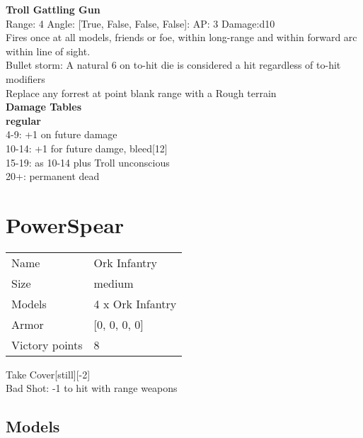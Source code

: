 {\bf Troll Gattling Gun } \\



Range: 4  Angle: [True, False, False, False]: AP: 3 Damage:d10 \\
Fires once at all models, friends or foe, within long-range and within forward arc within line of sight.\\ 
Bullet storm: A natural 6 on to-hit die is considered a hit regardless of to-hit modifiers\\ 
Replace any forrest at point blank range with a Rough terrain\\ 




 





{\bf Damage Tables} \\
 {\bf regular } \\
4-9: +1 on future damage \\
10-14: +1 for future damge, bleed[12] \\
15-19: as 10-14 plus Troll unconscious \\
20+: permanent dead \\










\pagebreak\pagebreak

\section{ PowerSpear }

\begin{tabular}{ll}
  Name & Ork Infantry \\
  Size & medium\\
  Models & 4 x Ork Infantry\\
  Armor & [0, 0, 0, 0]\\
  Victory points & 8\\
\end{tabular}

Take Cover[still][-2]\\ 
Bad Shot: -1 to hit with range weapons\\ 


\subsection{ Models }

